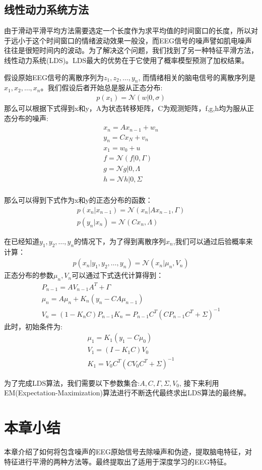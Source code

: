 	\subsection{线性动力系统方法}
	由于滑动平滑平均方法需要选定一个长度作为求平均值的时间窗口的长度，所以对于远小于这个时间窗口的情绪波动效果一般没，而EEG信号的噪声譬如肌电噪声往往是很短时间内的波动。为了解决这个问题，我们找到了另一种特征平滑方法，线性动力系统(LDS)。LDS最大的优势在于它使用了概率模型预测了加权结果。
	
	假设原始EEG信号的离散序列为${z_1, z_2, …, y_n}$, 而情绪相关的脑电信号的离散序列是${x_1, x_2, …, x_n}$。我们假设后者开始总是服从正态分布:
	\begin{align}
	p(x_1) = \mathcal{N}(w|0, \sigma)
	\end{align}
	那么可以根据下式得到x和y，A为状态转移矩阵，C为观测矩阵，f,g,h均为服从正态分布的噪声:
	\begin{align*}
	x_n = Ax_{n-1} + w_n \\
	y_n = Cx_N + v_n\\
	x_1 = w_0 + u\\
	f = \mathcal{N}(f|0, \Gamma)\\
	g = \mathcal{N}{g|0, \Lambda}\\
	h = \mathcal{N}{h|0, \Sigma}\\
	\end{align*}
	
	那么可以得到下式作为x和y的正态分布的函数：
	\begin{align}
	p(x_n|x_{n-1}) = \mathcal{N}(x_n|Ax_{n-1}, \Gamma)\\
	p(y_n|x_n) = \mathcal{N}(Cx_n, \Lambda)
	\end{align}
	
	在已经知道${y_1, y_2, …, y_n}$的情况下，为了得到离散序列$x_n$,我们可以通过后验概率来计算：
	\begin{align}
	p(x_n|y_1, y_2, …, y_n) = \mathcal{N}(x_n|\mu_n, V_n)
	\end{align}
	正态分布的参数$\mu_n, V_n$可以通过下式迭代计算得到：
	\begin{align}
	P_{n-1} = AV_{n-1}A^T + \Gamma\\
	\mu_n = A\mu_n + K_n(y_n - CA\mu_{n-1})\\
	V_n = (1 - K_nC)P_{n-1}
	K_n = P_{n-1}C^T(CP_{n-1}C^T + \Sigma)^{-1}
	\end{align}
	此时，初始条件为:
	\begin{align}
	\mu_1 = K_1(y_1 - C\mu_0)\\
	V_1 = (I - K_1C)V_0\\
	K_1 = V_0C^T(CV_0C^T+\Sigma) ^ {-1}
	\end{align}
	
	为了完成LDS算法，我们需要以下参数集合:${A, C, \Gamma, \Sigma, V_0}$, 接下来利用EM(Expectation-Maximization)算法进行不断迭代最终求出LDS算法的最终解。
	\section{本章小结}
	本章介绍了如何将包含噪声的EEG原始信号去除噪声和伪迹，提取脑电特征，对特征进行平滑的两种方法等。最终提取出了适用于深度学习的EEG特征。
	